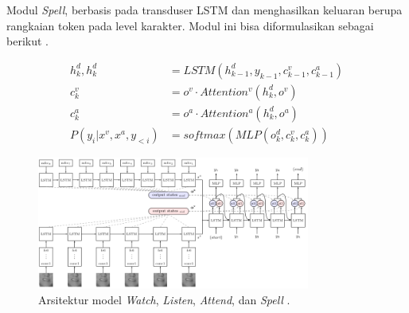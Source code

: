 Modul \textit{Spell}, berbasis pada transduser LSTM dan menghasilkan keluaran berupa rangkaian token pada level karakter. Modul ini bisa diformulasikan sebagai berikut \parencite{Chung2017}.

\begin{equation*}
    \begin{split}
        h^{d}_{k}, h^{d}_{k} &= LSTM(h^{d}_{k-1}, y_{k-1}, c^{v}_{k-1}, c^{a}_{k-1}) \\
        c^{v}_{k} &= o^{v} \cdot Attention^{v}(h^{d}_{k}, o^{v}) \\
        c^{a}_{k} &= o^{a} \cdot Attention^{a}(h^{d}_{k}, o^{a}) \\
        P(y_{i} | x^{v}, x^{a}, y_{<i}) &= softmax(MLP(o^{d}_{k}, c^{v}_{k}, c^{a}_{k}))
    \end{split}
\end{equation*}

\begin{figure}[h]
    \centering
    \includegraphics[width=0.8\textwidth]{resources/images/wlas.png}
    \caption{Arsitektur model \textit{Watch}, \textit{Listen}, \textit{Attend}, dan \textit{Spell} \parencite{Chung2017}.}
    \label{fig:wlas}
\end{figure}